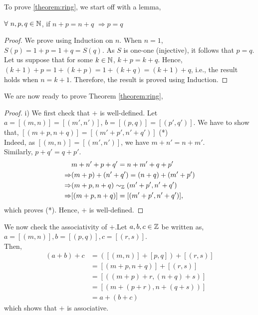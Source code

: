 \documentclass[11pt]{scrartcl}
\begin{document}
	To prove \ref{theorem:ring}, we start off with a lemma,
	
	\begin{lemma}
		$\forall\ n,p,q \in \mathbb N$, if $n+p = n+q$ $\Rightarrow p=q$
		\label{lemma:npq}
	\end{lemma}

	\begin{proof}
		We prove using Induction on $n$. When $n=1$, $S(p) = 1+p = 1+q = S(q)$. As $S$ is one-one (injective), it follows that $p=q$. Let us suppose that for some $k \in \mathbb N$, $k+p = k+q$. Hence, $(k+1)+p = 1+(k+p) = 1+(k+q) = (k+1)+q$, i.e., the result holds when $n=k+1$. Therefore, the result is proved using Induction.
	\end{proof}

	We are now ready to prove Theorem \ref{theorem:ring},
	
	\begin{proof}
		i) We first check that $+$ is well-defined. Let $a = [(m,n)] = [(m',n')]$, $b = [(p,q)] = [(p',q')]$. We have to show that,
		$[(m+p, n+q)] = [(m'+p', n'+q')]$ \hfill(*)\\
		Indeed, as $[(m,n)] = [(m',n')]$, we have $m+n' = n+m'$.\\
		Similarly, $p+q' = q+p'$.\\
		\begin{align*}
			&m+n'+p+q' = n+m'+q+p'\\
			\Rightarrow&(m+p)+(n'+q') = (n+q)+(m'+p')\\
			\Rightarrow&(m+p, n+q) \sim_{\mathbb Z} (m'+p', n'+q')\\
			\Rightarrow&[(m+p, n+q)] = [(m'+p', n'+q')],\\ 
		\end{align*}
		which proves (*). Hence, $+$ is well-defined.
	\end{proof}

	We now check the associativity of $+$.Let $a,b,c \in \mathbb Z$ be written as, $a = [(m,n)], b = [(p,q)], c = [(r,s)]$.\\
	Then,\\
	\begin{align*}
		(a+b)+c &= ([(m,n)]+[p,q])+[(r,s)]\\
		&= [(m+p, n+q)]+[(r,s)]\\
		&= [((m+p)+r, (n+q)+s)]\\
		&= [(m+(p+r), n+(q+s))]\\
		&= a+(b+c)
	\end{align*}
 	which shows that $+$ is associative.
 	
\end{document}
